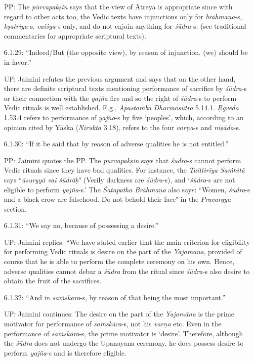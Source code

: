 PP: The \textit{pūrvapakṣin} says that the view of Ātreya is appropriate since with regard to other acts too, the Vedic texts have injunctions only for \textit{brāhmaṇa}-s, \textit{kṣatriya}-s, \textit{vaiśya}-s only, and do not enjoin anything for \textit{śūdra}-s. (see traditional commentaries for appropriate scriptural texts).

6.1.29: “Indeed/But (the opposite view), by reason of injunction, (we) should be in favor.”

UP: Jaimini refutes the previous argument and says that on the other hand, there are definite scriptural texts mentioning performance of sacrifice by \textit{śūdra}-s or their connection with the \textit{yajña} fire and so the right of \textit{śūdra}-s to perform Vedic rituals is well established. E.g., \textit{Apastamba Dharmasūtra} 5.14.1. \textit{Ṛgveda} 1.53.4 refers to performance of \textit{yajña}-s by five ‘peoples’, which, according to an opinion cited by Yāska (\textit{Nirukta} 3.18), refers to the four \textit{varṇa}-s and \textit{niṣāda}-s.

6.1.30: “If it be said that by reason of adverse qualities he is not entitled.”

PP: Jaimini quotes the PP. The \textit{pūrvapakṣin} says that \textit{śūdra}-s cannot perform Vedic rituals since they have bad qualities. For instance, the \textit{Taittirīya Saṁhitā} says ``\textit{āsuryyā vai śūdrāḥ}" (Verily darkness are \textit{śūdra}-s), and ‘\textit{śūdra}-s are not eligible to perform \textit{yajña}-s.’ The \textit{Śatapatha Brāhmaṇa} also says: ``Women, \textit{śūdra}-s and a black crow are falsehood. Do not behold their face" in the \textit{Pravargya} section.

6.1.31: “We say no, because of possessing a desire.”

UP: Jaimini replies: ``We have stated earlier that the main criterion for eligibility for performing Vedic rituals is desire on the part of the \textit{Yajamāna}, provided of course that he is able to perform the complete ceremony on his own. Hence, adverse qualities cannot debar a \textit{śūdra} from the ritual since \textit{śūdra}-s also desire to obtain the fruit of the sacrifices.

6.1.32: “And in \textit{saṁskāra}-s, by reason of that being the most important.”

UP: Jaimini continues: The desire on the part of the \textit{Yajamāna} is the prime motivator for performance of \textit{saṁskāra}-s, not his \textit{varṇa }etc. Even in the performance of \textit{saṁskāra}-s, the prime motivator is ‘desire’. Therefore, although the \textit{śūdra} does not undergo the Upanayana ceremony, he does possess desire to perform \textit{yajña}-s and is therefore eligible.

